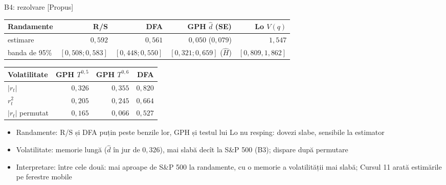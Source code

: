 \ifsolutions
\begin{frame}{B4: rezolvare [Propus]}
\itemsize{\scriptsize}
\begin{center}
\scriptsize
\begin{tabular}{lrrrr}
\toprule
Randamente & R/S & DFA & GPH $\hat d$ (SE) & Lo $V(q)$ \\
\midrule
estimare & $0{,}592$ & $0{,}561$ & $0{,}050$ ($0{,}079$) & $1{,}547$ \\
banda de 95\% & $[0{,}508; 0{,}583]$ & $[0{,}448; 0{,}550]$ & $[0{,}321; 0{,}659]$ ($\hat H$) & $[0{,}809, 1{,}862]$ \\
\bottomrule
\end{tabular}
\end{center}
\begin{center}
\scriptsize
\begin{tabular}{lrrr}
\toprule
Volatilitate & GPH $T^{0{,}5}$ & GPH $T^{0{,}6}$ & DFA \\
\midrule
$|r_t|$ & $0{,}326$ & $0{,}355$ & $0{,}820$ \\
$r_t^2$ & $0{,}205$ & $0{,}245$ & $0{,}664$ \\
$|r_t|$ permutat & $0{,}165$ & $0{,}066$ & $0{,}527$ \\
\bottomrule
\end{tabular}
\end{center}
\begin{itemize}
    \item Randamente: R/S și DFA puțin peste benzile lor, GPH și testul lui Lo nu resping: dovezi slabe, sensibile la estimator
    \item Volatilitate: memorie lungă ($\hat d$ în jur de $0{,}326$), mai slabă decît la S\&P 500 (B3); dispare după permutare
    \item Interpretare: între cele două: mai aproape de S\&P 500 la randamente, cu o memorie a volatilității mai slabă; Cursul 11 arată estimările pe ferestre mobile
\end{itemize}
\end{frame}
\fi

